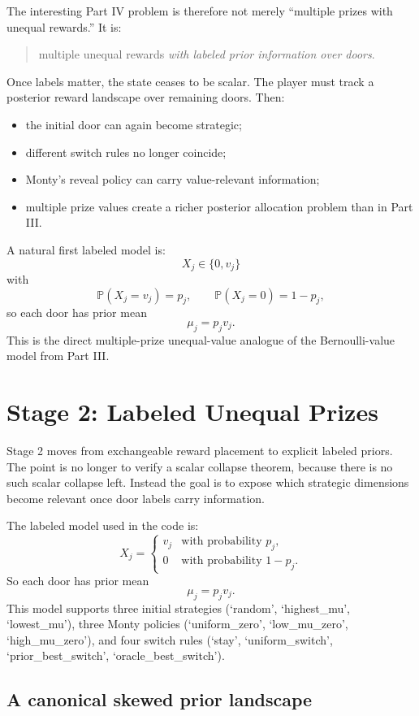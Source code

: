 \documentclass[11pt]{article}
\begin{document}
The interesting Part IV problem is therefore not merely ``multiple prizes with
unequal rewards.'' It is:
\begin{quote}
multiple unequal rewards \emph{with labeled prior information over doors}.
\end{quote}

Once labels matter, the state ceases to be scalar. The player must track a
posterior reward landscape over remaining doors. Then:
\begin{itemize}
\item the initial door can again become strategic;
\item different switch rules no longer coincide;
\item Monty's reveal policy can carry value-relevant information;
\item multiple prize values create a richer posterior allocation problem than in
Part III.
\end{itemize}

A natural first labeled model is:
\[
  X_j\in\{0,v_j\}
\]
with
\[
  \mathbb{P}(X_j=v_j)=p_j,
  \qquad
  \mathbb{P}(X_j=0)=1-p_j,
\]
so each door has prior mean
\[
  \mu_j=p_jv_j.
\]
This is the direct multiple-prize unequal-value analogue of the Bernoulli-value
model from Part III.

\section{Stage 2: Labeled Unequal Prizes}

Stage 2 moves from exchangeable reward placement to explicit labeled priors. The
point is no longer to verify a scalar collapse theorem, because there is no such
scalar collapse left. Instead the goal is to expose which strategic dimensions
become relevant once door labels carry information.

The labeled model used in the code is:
\[
  X_j=
  \begin{cases}
    v_j & \text{with probability } p_j,\\
    0   & \text{with probability } 1-p_j.
  \end{cases}
\]
So each door has prior mean
\[
  \mu_j=p_jv_j.
\]
This model supports three initial strategies (`random', `highest\_mu',
`lowest\_mu'), three Monty policies (`uniform\_zero', `low\_mu\_zero',
`high\_mu\_zero'), and four switch rules (`stay', `uniform\_switch',
`prior\_best\_switch', `oracle\_best\_switch').

\subsection{A canonical skewed prior landscape}
\end{document}
